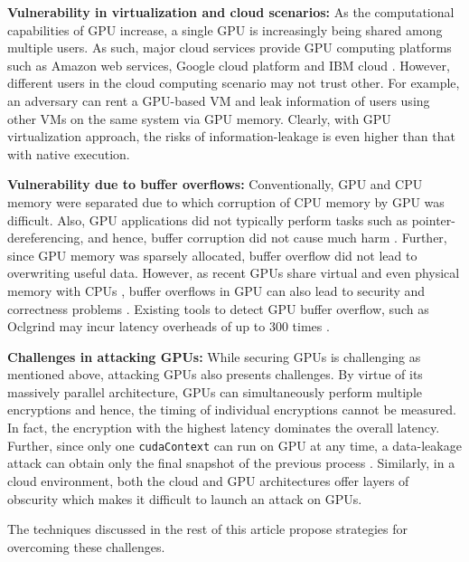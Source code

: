  
\textbf{Vulnerability in virtualization and cloud scenarios:} As the computational capabilities of GPU increase, a single GPU is increasingly being shared among  multiple users. As such, major cloud services provide GPU computing platforms such as Amazon web services, Google cloud platform and IBM cloud \cite{naghibijouybari2017constructing}.  However, different users in the cloud computing scenario may not trust other. For example, an adversary can rent a GPU-based VM and leak information of users using other VMs on the same system via GPU memory. Clearly, with GPU virtualization approach, the risks of information-leakage is even higher than that with native execution. 

    

\textbf{Vulnerability due to buffer overflows:} Conventionally, GPU and CPU memory were separated due to which corruption of CPU memory by GPU was difficult. Also, GPU applications did not typically perform tasks such as pointer-dereferencing, and hence, buffer corruption did not cause much harm \cite{erb2017dynamic}. Further, since GPU memory was sparsely allocated, buffer overflow did not lead to overwriting useful data. However, as recent GPUs share virtual and even physical memory with CPUs \cite{hsaRef}, buffer overflows in GPU can also lead to security and correctness problems \cite{erb2017dynamic}. Existing tools to detect GPU buffer overflow, such as Oclgrind may incur latency overheads of up to 300 times \cite{price2015oclgrind}. 

\textbf{Challenges in attacking GPUs: } While securing GPUs is challenging as mentioned above, attacking GPUs also presents challenges. By virtue of its massively parallel architecture, GPUs can simultaneously perform multiple encryptions and hence, the timing of individual encryptions cannot be measured. In fact, the encryption with the highest latency dominates the overall latency.  Further, since only one {\tt cudaContext} can run on GPU at any time, a data-leakage attack can obtain only the final snapshot of the previous process \cite{pietro2016cuda}. Similarly, in a cloud environment, both the cloud and GPU architectures offer layers of obscurity which makes it difficult to launch an attack on GPUs. 
    
The techniques discussed in the rest of this article propose strategies for overcoming these challenges. 
 
 


  
